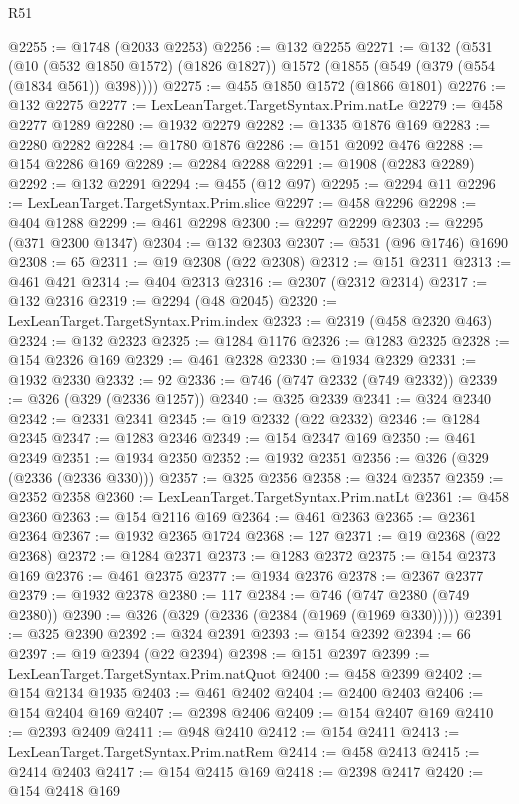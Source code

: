 \begin{lexlean}{R51}
\begin{coremodule}
@2255 := @1748 (@2033 @2253)
@2256 := @132 @2255
@2271 := @132
    (@531
      (@10 (@532 @1850 @1572) (@1826 @1827))
      @1572
      (@1855 (@549 (@379 (@554 (@1834 @561)) @398))))
@2275 := @455 @1850 @1572 (@1866 @1801)
@2276 := @132 @2275
@2277 := LexLeanTarget.TargetSyntax.Prim.natLe
@2279 := @458 @2277 @1289
@2280 := @1932 @2279
@2282 := @1335 @1876 @169
@2283 := @2280 @2282
@2284 := @1780 @1876
@2286 := @151 @2092 @476
@2288 := @154 @2286 @169
@2289 := @2284 @2288
@2291 := @1908 (@2283 @2289)
@2292 := @132 @2291
@2294 := @455 (@12 @97)
@2295 := @2294 @11
@2296 := LexLeanTarget.TargetSyntax.Prim.slice
@2297 := @458 @2296
@2298 := @404 @1288
@2299 := @461 @2298
@2300 := @2297 @2299
@2303 := @2295 (@371 @2300 @1347)
@2304 := @132 @2303
@2307 := @531 (@96 @1746) @1690
@2308 := 65
@2311 := @19 @2308 (@22 @2308)
@2312 := @151 @2311
@2313 := @461 @421
@2314 := @404 @2313
@2316 := @2307 (@2312 @2314)
@2317 := @132 @2316
@2319 := @2294 (@48 @2045)
@2320 := LexLeanTarget.TargetSyntax.Prim.index
@2323 := @2319 (@458 @2320 @463)
@2324 := @132 @2323
@2325 := @1284 @1176
@2326 := @1283 @2325
@2328 := @154 @2326 @169
@2329 := @461 @2328
@2330 := @1934 @2329
@2331 := @1932 @2330
@2332 := 92
@2336 := @746 (@747 @2332 (@749 @2332))
@2339 := @326 (@329 (@2336 @1257))
@2340 := @325 @2339
@2341 := @324 @2340
@2342 := @2331 @2341
@2345 := @19 @2332 (@22 @2332)
@2346 := @1284 @2345
@2347 := @1283 @2346
@2349 := @154 @2347 @169
@2350 := @461 @2349
@2351 := @1934 @2350
@2352 := @1932 @2351
@2356 := @326 (@329 (@2336 (@2336 @330)))
@2357 := @325 @2356
@2358 := @324 @2357
@2359 := @2352 @2358
@2360 := LexLeanTarget.TargetSyntax.Prim.natLt
@2361 := @458 @2360
@2363 := @154 @2116 @169
@2364 := @461 @2363
@2365 := @2361 @2364
@2367 := @1932 @2365 @1724
@2368 := 127
@2371 := @19 @2368 (@22 @2368)
@2372 := @1284 @2371
@2373 := @1283 @2372
@2375 := @154 @2373 @169
@2376 := @461 @2375
@2377 := @1934 @2376
@2378 := @2367 @2377
@2379 := @1932 @2378
@2380 := 117
@2384 := @746 (@747 @2380 (@749 @2380))
@2390 := @326 (@329 (@2336 (@2384 (@1969 (@1969 @330)))))
@2391 := @325 @2390
@2392 := @324 @2391
@2393 := @154 @2392
@2394 := 66
@2397 := @19 @2394 (@22 @2394)
@2398 := @151 @2397
@2399 := LexLeanTarget.TargetSyntax.Prim.natQuot
@2400 := @458 @2399
@2402 := @154 @2134 @1935
@2403 := @461 @2402
@2404 := @2400 @2403
@2406 := @154 @2404 @169
@2407 := @2398 @2406
@2409 := @154 @2407 @169
@2410 := @2393 @2409
@2411 := @948 @2410
@2412 := @154 @2411
@2413 := LexLeanTarget.TargetSyntax.Prim.natRem
@2414 := @458 @2413
@2415 := @2414 @2403
@2417 := @154 @2415 @169
@2418 := @2398 @2417
@2420 := @154 @2418 @169

\end{coremodule}
\end{lexlean}
